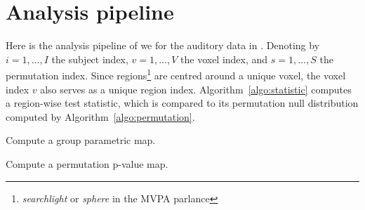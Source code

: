 \documentclass[12pt,a4paper]{article}
\begin{document}















\appendix


\newpage

\section{Analysis pipeline}
\label{apx:analysis}

Here is the analysis pipeline of \cite{stelzer_statistical_2013} we for the auditory data in \cite{gilron_quantifying_2016}.
Denoting by 
$i=1,\dots,I$ the subject index, 
$v=1,\dots,V$ the voxel index, and 
$s = 1,\dots,S$ the permutation index. 
Since regions\footnote{\emph{searchlight} or \emph{sphere} in the MVPA parlance} are centred around a unique voxel, the voxel index $v$ also serves as a unique region index.
Algorithm~\ref{algo:statistic} computes a region-wise test statistic, which is compared to its permutation null distribution computed by Algorithm~\ref{algo:permutation}.


\begin{algorithm}[H]
\caption{Compute a group parametric map.}
\label{algo:statistic}

\end{algorithm}


\begin{algorithm}[H]
\caption{Compute a permutation p-value map.} 
\label{algo:permutation}

\end{algorithm}
\end{document}
